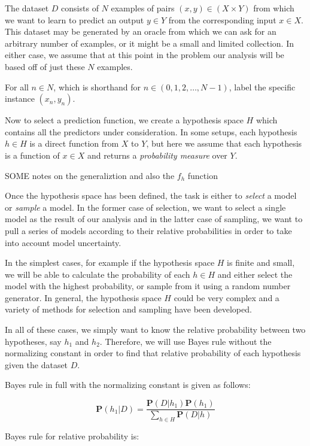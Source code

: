 \documentclass[twoside]{article}
\begin{document}
The dataset \(D\) consists of \(N\) examples of pairs \((x, y) \in (X \times Y) \) from which we want to learn to predict an output \(y \in Y\) from the corresponding input \(x \in X\). This dataset may be generated by an oracle from which we can ask for an arbitrary number of examples, or it might be a small and limited collection. In either case, we assume that at this point in the problem our analysis will be based off of just these \(N\) examples.

For all \(n \in N\), which is shorthand for \(n \in (0, 1, 2,\ldots,N-1)\), label the specific instance \((x_n, y_n)\).

Now to select a prediction function, we create a hypothesis space \(H\) which contains all the predictors under consideration. In some setups, each hypothesis \(h \in H\) is a direct function from \(X\) to \(Y\), but here we assume that each hypothesis is a function of \(x \in X\) and returns a \textit{probability measure} over \(Y\).

SOME notes on the generaliztion and also the \(f_h\) function

Once the hypothesis space has been defined, the task is either to \textit{select} a model or \textit{sample} a model. In the former case of selection, we want to select a single model as the result of our analysis and in the latter case of sampling, we want to pull a series of models according to their relative probabilities in order to take into account model uncertainty.

In the simplest cases, for example if the hypothesis space \(H\) is finite and small, we will be able to calculate the probability of each \(h \in H\) and either select the model with the highest probability, or sample from it using a random number generator. In general, the hypothesis space \(H\) could be very complex and a variety of methods for selection and sampling have been developed.

In all of these cases, we simply want to know the relative probability between two hypotheses, say \(h_1\) and \(h_2\). Therefore, we will use Bayes rule without the normalizing constant in order to find that relative probability of each hypothesis given the dataset \(D\).

Bayes rule in full with the normalizing constant is given as follows:

\[\mathbf{P}(h_1|D)=\frac{\mathbf{P}(D|h_1)\mathbf{P}(h_1)}{\sum_{h \in H}\mathbf{P}(D|h)}\]

Bayes rule for relative probability is:
\end{document}
